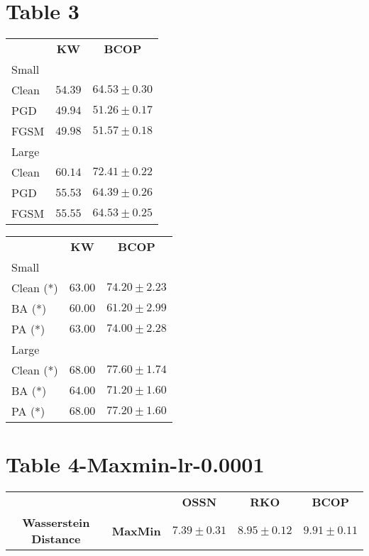 \documentclass{article}%
\begin{document}
%
\section*{Table 3}%
\label{sec:Table3}%
\begin{minipage}{0.5\textwidth}%
\begin{tabularx}{\textwidth}{lcc}%
\textbf{}&\textbf{KW}&\textbf{BCOP}\\%
\cmidrule{1-3}%
Small&&\\%
\cmidrule{1-3}%
Clean&$54.39$&$\mathbf{64.53}\pm0.30$\\%
PGD&$49.94$&$\mathbf{51.26}\pm0.17$\\%
FGSM&$49.98$&$\mathbf{51.57}\pm0.18$\\%
\cmidrule{1-3}%
Large&&\\%
\cmidrule{1-3}%
Clean&$60.14$&$\mathbf{72.41}\pm0.22$\\%
PGD&$55.53$&$\mathbf{64.39}\pm0.26$\\%
FGSM&$55.55$&$\mathbf{64.53}\pm0.25$\\%
\end{tabularx}%
\end{minipage}%
\begin{minipage}{0.5\textwidth}%
\begin{tabularx}{\textwidth}{lcc}%
\textbf{}&\textbf{KW}&\textbf{BCOP}\\%
\cmidrule{1-3}%
Small&&\\%
\cmidrule{1-3}%
Clean (*)&$63.00$&$\mathbf{74.20}\pm2.23$\\%
BA (*)&$60.00$&$\mathbf{61.20}\pm2.99$\\%
PA (*)&$63.00$&$\mathbf{74.00}\pm2.28$\\%
\cmidrule{1-3}%
Large&&\\%
\cmidrule{1-3}%
Clean (*)&$68.00$&$\mathbf{77.60}\pm1.74$\\%
BA (*)&$64.00$&$\mathbf{71.20}\pm1.60$\\%
PA (*)&$68.00$&$\mathbf{77.20}\pm1.60$\\%
\end{tabularx}%
\end{minipage}

%
\section*{Table 4{-}Maxmin{-}lr{-}0.0001}%
\label{sec:Table4{-}Maxmin{-}lr{-}0.0001}%
\begin{tabularx}{\textwidth}{ccccc}%
\textbf{}&\textbf{}&\textbf{OSSN}&\textbf{RKO}&\textbf{BCOP}\\%
\cmidrule{1-5}%
\multirow{1}{*}{\textbf{Wasserstein Distance}}&\textbf{MaxMin}&$7.39\pm0.31$&$8.95\pm0.12$&$\mathbf{9.91}\pm0.11$\\%
\end{tabularx}
\end{document}
